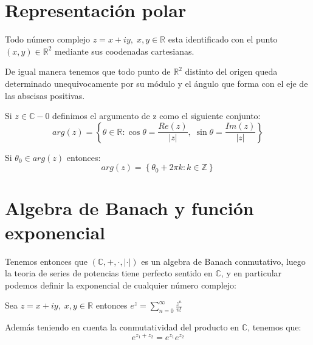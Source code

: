 \section{Representación polar}
Todo número complejo \(z=x+iy, \; x,y \in \mathbb{R}\) esta identificado con el punto \((x,y)\in \mathbb{R}^{2}\) mediante sus coodenadas cartesianas.

De igual manera tenemos que todo punto de \(\mathbb{R}^{2}\) distinto del origen queda determinado unequivocamente por su módulo y el ángulo que forma con el eje de las abscisas positivas.


\begin{definicion}[Argumento]

  Si \(z \in \mathbb{C}-{0}\) definimos el argumento de z como el siguiente conjunto:
  \[arg(z) = \left\{ \theta \in \mathbb{R} : \cos{\theta}=\frac{Re(z)}{|z|}, \; \sin{\theta}=\frac{Im(z)}{|z|}\right\}\]
\end{definicion}

\begin{proposicion}
 Si \(\theta_0 \in arg(z)\) entonces:
 \[arg(z)= \left\{ \theta_0+2\pi k : k \in \mathbb{Z} \right\}\]
\end{proposicion}

\section{Algebra de Banach y función exponencial}
Tenemos entonces que \((\mathbb{C},+,\cdot, |\cdot|)\) es un algebra de Banach conmutativo, luego la teoria de series de potencias tiene perfecto sentido en \(\mathbb{C}\), y en particular podemos definir la exponencial de cualquier número complejo:

Sea \(z=x+iy, \; x,y\in \mathbb{R}\) entonces \(e^z=\sum\limits_{n=0}^{\infty}\frac{z^n}{n!}\)

Además teniendo en cuenta la conmutatividad del producto en \(\mathbb{C}\), tenemos que:
\[e^{z_1+z_2}=e^{z_1}e^{z_2}\]


